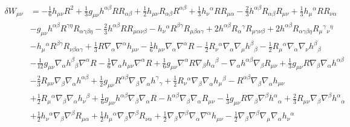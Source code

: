 \documentclass[10pt,letterpaper]{article}
\numberwithin{equation}{section}
\begin{document}
\begin{align}
	\delta W_{\mu\nu} &=
- \tfrac{1}{6} h_{\mu \nu} R^2 + \tfrac{1}{3} g_{\mu \nu} h^{\alpha \beta} R R_{\alpha \beta} + \tfrac{1}{2} h_{\mu \nu} R_{\alpha \beta} R^{\alpha \beta} + \tfrac{1}{3} h_{\nu}{}^{\alpha} R R_{\mu \alpha} -  \tfrac{2}{3} h^{\alpha \beta} R_{\alpha \beta} R_{\mu \nu} + \tfrac{1}{3} h_{\mu}{}^{\alpha} R R_{\nu \alpha} \\
& -  g_{\mu \nu} h^{\alpha \beta} R^{\gamma \eta} R_{\alpha \gamma \beta \eta} -  \tfrac{2}{3} h^{\alpha \beta} R R_{\mu \alpha \nu \beta} -  h_{\nu}{}^{\alpha} R^{\beta \gamma} R_{\mu \beta \alpha \gamma} + 2 h^{\alpha \beta} R_{\alpha}{}^{\gamma} R_{\mu \gamma \nu \beta} + 2 h^{\alpha \beta} R_{\alpha \gamma \beta \eta} R_{\mu}{}^{\gamma}{}_{\nu}{}^{\eta}\nonumber \\
& -  h_{\mu}{}^{\alpha} R^{\beta \gamma} R_{\nu \beta \alpha \gamma} + \tfrac{1}{3} R \nabla_{\alpha}\nabla^{\alpha}h_{\mu \nu} -  \tfrac{1}{6} h_{\mu \nu} \nabla_{\alpha}\nabla^{\alpha}R -  \tfrac{1}{2} R_{\nu}{}^{\alpha} \nabla_{\alpha}\nabla_{\mu}h^{\beta}{}_{\beta} -  \tfrac{1}{2} R_{\mu}{}^{\alpha} \nabla_{\alpha}\nabla_{\nu}h^{\beta}{}_{\beta}\nonumber \\
& -  \tfrac{1}{12} g_{\mu \nu} \nabla_{\alpha}h^{\beta}{}_{\beta} \nabla^{\alpha}R -  \tfrac{1}{6} \nabla_{\alpha}h_{\mu \nu} \nabla^{\alpha}R + \tfrac{1}{6} g_{\mu \nu} \nabla^{\alpha}R \nabla_{\beta}h_{\alpha}{}^{\beta} -  \nabla_{\alpha}h^{\alpha \beta} \nabla_{\beta}R_{\mu \nu} + \tfrac{1}{3} g_{\mu \nu} R \nabla_{\beta}\nabla_{\alpha}h^{\alpha \beta}\nonumber \\
& -  \tfrac{2}{3} R_{\mu \nu} \nabla_{\beta}\nabla_{\alpha}h^{\alpha \beta} + \tfrac{1}{2} g_{\mu \nu} R^{\alpha \beta} \nabla_{\beta}\nabla_{\alpha}h^{\gamma}{}_{\gamma} + \tfrac{1}{2} R_{\nu}{}^{\alpha} \nabla_{\beta}\nabla_{\alpha}h_{\mu}{}^{\beta} -  R^{\alpha \beta} \nabla_{\beta}\nabla_{\alpha}h_{\mu \nu}\nonumber \\
&+ \tfrac{1}{2} R_{\mu}{}^{\alpha} \nabla_{\beta}\nabla_{\alpha}h_{\nu}{}^{\beta} + \tfrac{1}{6} g_{\mu \nu} h^{\alpha \beta} \nabla_{\beta}\nabla_{\alpha}R -  h^{\alpha \beta} \nabla_{\beta}\nabla_{\alpha}R_{\mu \nu} -  \tfrac{1}{3} g_{\mu \nu} R \nabla_{\beta}\nabla^{\beta}h^{\alpha}{}_{\alpha} + \tfrac{2}{3} R_{\mu \nu} \nabla_{\beta}\nabla^{\beta}h^{\alpha}{}_{\alpha}\nonumber \\
& + \tfrac{1}{2} h_{\nu}{}^{\alpha} \nabla_{\beta}\nabla^{\beta}R_{\mu \alpha} + \tfrac{1}{2} h_{\mu}{}^{\alpha} \nabla_{\beta}\nabla^{\beta}R_{\nu \alpha} + \tfrac{1}{2} \nabla_{\beta}\nabla^{\beta}\nabla_{\alpha}\nabla^{\alpha}h_{\mu \nu} -  \tfrac{1}{2} \nabla_{\beta}\nabla^{\beta}\nabla_{\mu}\nabla_{\alpha}h_{\nu}{}^{\alpha}\nonumber \\

\end{align}
\end{document}
